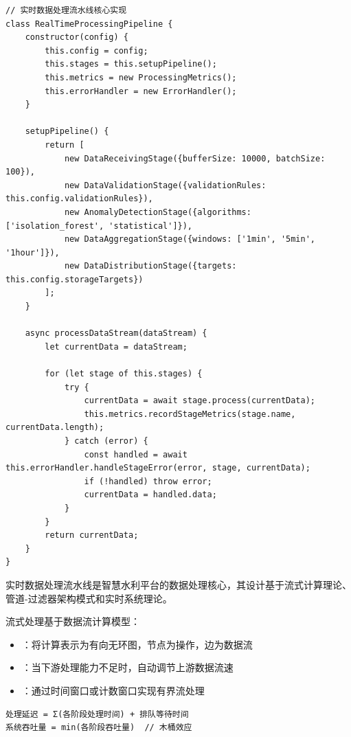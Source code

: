 \begin{lstlisting}[style=javascript]
// 实时数据处理流水线核心实现
class RealTimeProcessingPipeline {
    constructor(config) {
        this.config = config;
        this.stages = this.setupPipeline();
        this.metrics = new ProcessingMetrics();
        this.errorHandler = new ErrorHandler();
    }
    
    setupPipeline() {
        return [
            new DataReceivingStage({bufferSize: 10000, batchSize: 100}),
            new DataValidationStage({validationRules: this.config.validationRules}),
            new AnomalyDetectionStage({algorithms: ['isolation_forest', 'statistical']}),
            new DataAggregationStage({windows: ['1min', '5min', '1hour']}),
            new DataDistributionStage({targets: this.config.storageTargets})
        ];
    }
    
    async processDataStream(dataStream) {
        let currentData = dataStream;
        
        for (let stage of this.stages) {
            try {
                currentData = await stage.process(currentData);
                this.metrics.recordStageMetrics(stage.name, currentData.length);
            } catch (error) {
                const handled = await this.errorHandler.handleStageError(error, stage, currentData);
                if (!handled) throw error;
                currentData = handled.data;
            }
        }
        return currentData;
    }
}
\end{lstlisting}


实时数据处理流水线是智慧水利平台的数据处理核心，其设计基于流式计算理论、管道-过滤器架构模式和实时系统理论。


流式处理基于数据流计算模型：

\begin{itemize}
\tightlist
\item
  ：将计算表示为有向无环图，节点为操作，边为数据流
\item
  ：当下游处理能力不足时，自动调节上游数据流速
\item
  ：通过时间窗口或计数窗口实现有界流处理
\end{itemize}

\begin{lstlisting}
处理延迟 = Σ(各阶段处理时间) + 排队等待时间
系统吞吐量 = min(各阶段吞吐量)  // 木桶效应
\end{lstlisting}

